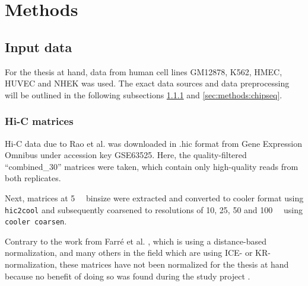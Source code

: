 \section{Methods}

\subsection{Input data}
For the thesis at hand, data from human cell lines GM12878, K562, HMEC, HUVEC and NHEK was used.
The exact data sources and data preprocessing will be outlined in the following subsections \ref{sec:methods:hicMatrices} and \ref{sec:methods:chipseq}.

\subsubsection{Hi-C matrices} \label{sec:methods:hicMatrices}
Hi-C data due to Rao et al. \cite{Rao2014} was downloaded 
in .hic format from Gene Expression Omnibus under accession key GSE63525.
Here, the quality-filtered ``combined\_30'' matrices were taken, which contain only high-quality reads from 
both replicates.

Next, matrices at \SI{5}{\kilo\bp} binsize were extracted and converted to cooler format using \texttt{hic2cool}
and subsequently coarsened to resolutions of 10, 25, 50 and \SI{100}{\kilo\bp} using \texttt{cooler coarsen}.

Contrary to the work from Farr\'e et al. \cite{Farre2018a}, which is using a distance-based normalization,
and many others in the field which are using ICE- or KR-normalization, 
these matrices have not been normalized for the thesis at hand
because no benefit of doing so was found during the study project \cite{Krauth2020}.

